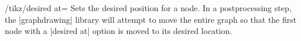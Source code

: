 \begin{key}{/tikz/desired at=}
  Sets the desired position for a node. In a postprocessing step, the
  |graphdrawing| library will attempt to move the entire graph so that
  the first node with a |desired at| option is moved to its desired 
  location.
  \begin{codeexample}[]
  \end{codeexample}
\end{key}

%
%
%
%  
%
%
%

